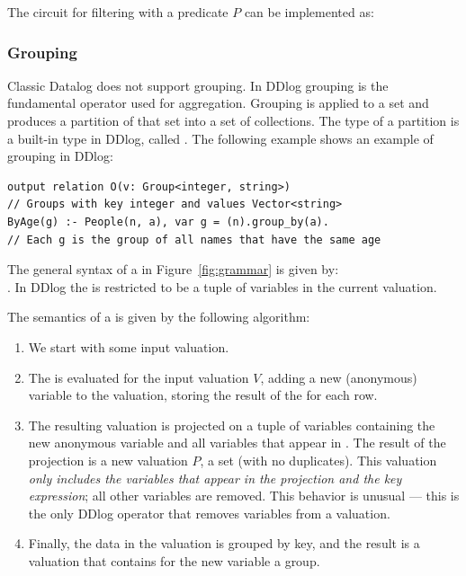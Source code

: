 The circuit for filtering with a predicate $P$ can be implemented as:


\subsubsection{Grouping}\label{sec:grouping}

Classic Datalog does not support grouping.
In DDlog grouping is the fundamental operator used for aggregation.  
Grouping is applied to a set and produces a partition of that set
into a set of collections.  The type of a partition is a built-in
type in DDlog, called .
The following example shows an example of grouping in DDlog:

\begin{lstlisting}[language=ddlog]
output relation O(v: Group<integer, string>) 
// Groups with key integer and values Vector<string>
ByAge(g) :- People(n, a), var g = (n).group_by(a).  
// Each g is the group of all names that have the same age
\end{lstlisting}

The general syntax of a  in Figure~\ref{fig:grammar} is given by: \\
.
In DDlog the  is restricted to be a tuple 
of variables in the current valuation.

The semantics of a  is given by the following algorithm:

\begin{enumerate}
    \item We start with some input valuation.
    \item The  is evaluated for the input valuation $V$,
    adding a new (anonymous) variable to the valuation, storing the result
    of the  for each row.
    \item The resulting valuation is projected on a tuple of variables containing
    the new anonymous variable and all variables that appear in .
    The result of the projection is a new valuation $P$, a set (with no duplicates).
    This valuation \emph{only includes the variables that appear in the projection and
    the key expression}; all other variables are removed.  This behavior is unusual --- 
    this is the only DDlog operator that removes variables from a valuation.
    \item Finally, the data in the valuation is grouped by key,
    and the result is a valuation that contains for the new variable a group.
\end{enumerate}


